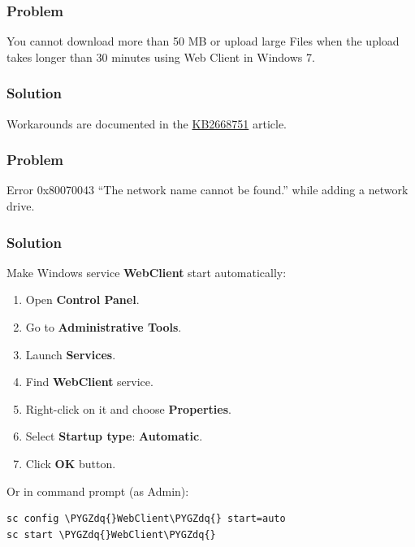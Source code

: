 \documentclass[letterpaper,10pt,english]{sphinxmanual}
\def\PYGZdq{\char`\"}
\begin{document}
\subsubsection{Problem}
\label{files/access_webdav:id10}
You cannot download more than 50 MB or upload large Files when the upload takes
longer than 30 minutes using Web Client in Windows 7.


\subsubsection{Solution}
\label{files/access_webdav:id11}
Workarounds are documented in the \href{https://support.microsoft.com/kb/2668751}{KB2668751} article.


\subsubsection{Problem}
\label{files/access_webdav:id12}
Error 0x80070043 ``The network name cannot be found.'' while adding a network drive.


\subsubsection{Solution}
\label{files/access_webdav:id13}
Make Windows service \textbf{WebClient} start automatically:
\begin{enumerate}
\item {} 
Open \textbf{Control Panel}.

\item {} 
Go to \textbf{Administrative Tools}.

\item {} 
Launch \textbf{Services}.

\item {} 
Find \textbf{WebClient} service.

\item {} 
Right-click on it and choose \textbf{Properties}.

\item {} 
Select \textbf{Startup type}: \textbf{Automatic}.

\item {} 
Click \textbf{OK} button.

\end{enumerate}

Or in command prompt (as Admin):

\begin{Verbatim}[commandchars=\\\{\}]
sc config \PYGZdq{}WebClient\PYGZdq{} start=auto
sc start \PYGZdq{}WebClient\PYGZdq{}
\end{Verbatim}
\end{document}
